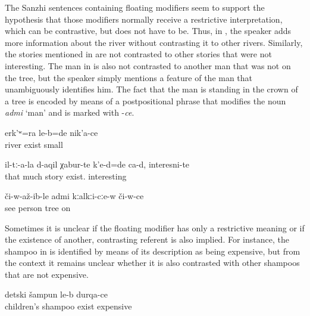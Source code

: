The Sanzhi sentences containing floating modifiers seem to support the hypothesis that those modifiers normally receive a restrictive interpretation, which can be contrastive, but does not have to be. Thus, in , the speaker adds more information about the river without contrasting it to other rivers. Similarly, the stories mentioned in  are not contrasted to other stories that were not interesting. The man in  is also not contrasted to another man that was not on the tree, but the speaker simply mentions a feature of the man that unambiguously identifies him. The fact that the man is standing in the crown of a tree is encoded by means of a postpositional phrase that modifies the noun \textit{admi} `man' and is marked with -\textit{ce}.

\begin{exe}
	\ex	\label{ex:‎There was also a river there that was small}
	\gll	erk'ʷ=ra	le-b=de	nik'a-ce\\
		river	exist	small\\
	\glt	{}

	\ex	\label{ex:About them there were, are many stories, interesting@19c}
	\gll	il-tː-a-la	d-aqil	χabur-te	k'e-d=de	ca-d,	interesni-te\\
		that	much	story	exist.		interesting\\
	\glt	{}

	\ex	\label{ex:and then (he) saw the man on the tree@19c}
	\gll	či-w-až-ib-le admi	kːalkːi-cːe-w	či-w-ce\\
		see	person	tree	on\\
	\glt	{}
\end{exe}

Sometimes it is unclear if the floating modifier has only a restrictive meaning or if the existence of another, contrasting referent is also implied. For instance, the shampoo in  is identified by means of its description as being expensive, but from the context it remains unclear whether it is also contrasted with other shampoos that are not expensive.
%
\begin{exe}

		\ex	\label{ex:There is shampoo for children, expensive@19c}
		\gll	detski	šampun	le-b	durqa-ce\\
			children's	shampoo	exist	expensive\\
		\glt	{}
\end{exe}


